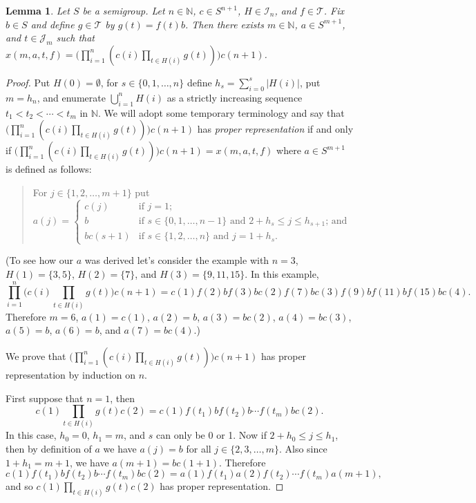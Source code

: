 \documentclass[12pt]{article}
\theoremstyle{plain}
\newtheorem{lem}[thm]{Lemma}
\theoremstyle{definition}
\newcommand{\bbN}{\mathbb{N}}
\newcommand{\calI}{\mathcal{I}}
\newcommand{\calJ}{\mathcal{J}}
\newcommand{\calT}{\mathcal{T}}
\begin{document}
\begin{lem}
  Let $S$ be a semigroup.
  Let $n \in \bbN$, $c \in S^{n+1}$, $H \in \calI_n$, and $f \in \calT$.
  Fix $b \in S$ and define $g \in \calT$ by $g(t) = f(t)b$.
  Then there exists $m \in \bbN$, $a \in S^{m+1}$, and $t \in \calJ_m$ such that $x(m, a, t, f) = \bigl(\prod_{i=1}^n ( c(i)\prod_{t \in H(i)} g(t)) \bigr) c(n+1)$.
\end{lem}
\begin{proof}
  Put $H(0) = \emptyset$, for $s \in \{0, 1, \ldots, n\}$ define $h_s = \sum_{i=0}^s |H(i)|$, put $m = h_n$, and enumerate $\bigcup_{i=1}^n H(i)$ as a strictly increasing sequence $t_1 < t_2 < \cdots < t_m$ in $\bbN$. 
  We will adopt some temporary terminology and say that $\bigl(\prod_{i=1}^n ( c(i)\prod_{t \in H(i)} g(t)) \bigr) c(n+1)$ has \textsl{proper representation} if and only if $\bigl(\prod_{i=1}^n ( c(i)\prod_{t \in H(i)} g(t)) \bigr) c(n+1) = x(m, a, t, f)$ where $a \in S^{m+1}$ is defined as follows: 
  \begin{quote}
    For $j \in \{1, 2, \ldots, m+1\}$ put
    \[
      a(j) = 
      \begin{cases}
        c(j) & \mbox{if $j=1$;} \\
        b    & \mbox{if $s \in \{0, 1, \ldots, n-1\}$ and $2+h_s \le j \le h_{s+1}$; and } \\
        bc(s+1) & \mbox{if $s \in \{1, 2, \ldots, n\}$ and $j = 1+h_s$.}
      \end{cases}
    \]
  \end{quote}
  (To see how our $a$ was derived let's consider the example with $n = 3$, $H(1) = \{3, 5\}$, $H(2) = \{7\}$, and $H(3) = \{9, 11, 15\}$. 
  In this example,
  \[
    \prod_{i=1}^n\bigl( c(i) \prod_{t \in H(i)} g(t) \bigr) c(n+1) = c(1)f(2)bf(3)b c(2) f(7)bc(3)f(9)bf(11)bf(15)bc(4).
  \]
  Therefore $m = 6$, $a(1) = c(1)$, $a(2) = b$, $a(3) = bc(2)$, $a(4) = bc(3)$, $a(5) = b$, $a(6) = b$, and $a(7) = bc(4)$.)
  
  We prove that $\bigl(\prod_{i=1}^n ( c(i)\prod_{t \in H(i)} g(t)) \bigr) c(n+1)$ has proper representation by induction on $n$.

  First suppose that $n=1$, then
  \[
    c(1)\prod_{t \in H(i)} g(t) c(2) = c(1)f(t_1)bf(t_2)b \cdots f(t_m)bc(2).
  \]
  In this case, $h_0 = 0$, $h_1 = m$, and $s$ can only be 0 or 1.
  Now if $2+h_0 \le j \le h_1$, then by definition of $a$ we have $a(j) = b$ for all $j \in \{2, 3, \ldots, m\}$. 
  Also since $1+h_1 = m+1$, we have $a(m+1) = bc(1+1)$.
  Therefore
  \[
    c(1)f(t_1)bf(t_2)b \cdots f(t_m)bc(2) = a(1)f(t_1)a(2)f(t_2) \cdots f(t_m)a(m+1),
  \]
and so $c(1)\prod_{t \in H(i)} g(t) c(2)$ has proper representation. 


\end{proof}
\end{document}
